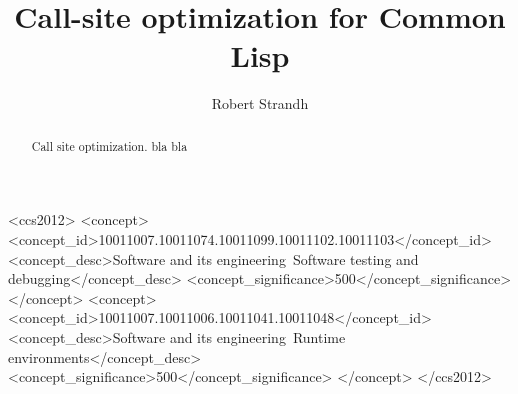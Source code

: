 \documentclass[format=sigconf]{acmart}
\def\inputtex#1{}
\begin{document}
\title{Call-site optimization for Common Lisp}

\author{Robert Strandh}


\begin{abstract}
Call site optimization. bla bla
\end{abstract}


\begin{CCSXML}
<ccs2012>
<concept>
<concept_id>10011007.10011074.10011099.10011102.10011103</concept_id>
<concept_desc>Software and its engineering~Software testing and debugging</concept_desc>
<concept_significance>500</concept_significance>
</concept>
<concept>
<concept_id>10011007.10011006.10011041.10011048</concept_id>
<concept_desc>Software and its engineering~Runtime environments</concept_desc>
<concept_significance>500</concept_significance>
</concept>
</ccs2012>
\end{CCSXML}



\maketitle


\inputtex{sec-introduction.tex}
\inputtex{sec-previous.tex}
\inputtex{sec-sicl.tex}
\inputtex{sec-our-method.tex}
\inputtex{sec-benefits.tex}
\inputtex{sec-disadvantages.tex}
\inputtex{sec-conclusions.tex}
\inputtex{sec-acknowledgments.tex}


%

\end{document}
